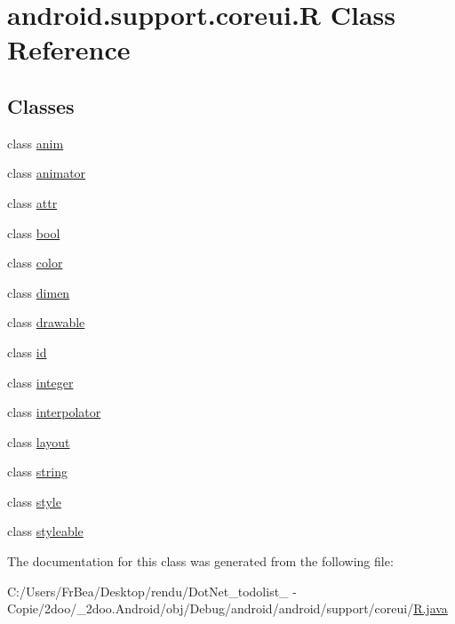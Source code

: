 \hypertarget{classandroid_1_1support_1_1coreui_1_1_r}{
\section{android.support.coreui.R Class Reference}
\label{classandroid_1_1support_1_1coreui_1_1_r}
}
\subsection*{Classes}
\begin{CompactItemize}
\item 
class \hyperlink{classandroid_1_1support_1_1coreui_1_1_r_1_1anim}{anim}
\item 
class \hyperlink{classandroid_1_1support_1_1coreui_1_1_r_1_1animator}{animator}
\item 
class \hyperlink{classandroid_1_1support_1_1coreui_1_1_r_1_1attr}{attr}
\item 
class \hyperlink{classandroid_1_1support_1_1coreui_1_1_r_1_1bool}{bool}
\item 
class \hyperlink{classandroid_1_1support_1_1coreui_1_1_r_1_1color}{color}
\item 
class \hyperlink{classandroid_1_1support_1_1coreui_1_1_r_1_1dimen}{dimen}
\item 
class \hyperlink{classandroid_1_1support_1_1coreui_1_1_r_1_1drawable}{drawable}
\item 
class \hyperlink{classandroid_1_1support_1_1coreui_1_1_r_1_1id}{id}
\item 
class \hyperlink{classandroid_1_1support_1_1coreui_1_1_r_1_1integer}{integer}
\item 
class \hyperlink{classandroid_1_1support_1_1coreui_1_1_r_1_1interpolator}{interpolator}
\item 
class \hyperlink{classandroid_1_1support_1_1coreui_1_1_r_1_1layout}{layout}
\item 
class \hyperlink{classandroid_1_1support_1_1coreui_1_1_r_1_1string}{string}
\item 
class \hyperlink{classandroid_1_1support_1_1coreui_1_1_r_1_1style}{style}
\item 
class \hyperlink{classandroid_1_1support_1_1coreui_1_1_r_1_1styleable}{styleable}
\end{CompactItemize}


The documentation for this class was generated from the following file:\begin{CompactItemize}
\item 
C:/Users/FrBea/Desktop/rendu/DotNet\_\-todolist\_ - Copie/2doo/\_\-2doo.Android/obj/Debug/android/android/support/coreui/\hyperlink{android_2support_2coreui_2_r_8java}{R.java}\end{CompactItemize}
